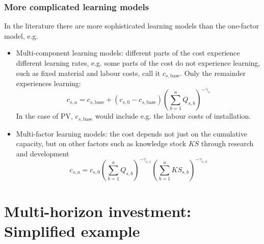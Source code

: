 \documentclass[10pt,aspectratio=169,dvipsnames]{beamer}
\let\olditem\item
\renewcommand{\item}{%
\olditem\vspace{5pt}}
\begin{document}
\begin{frame}
  \frametitle{More complicated learning models}

  In the literature there are more sophisticated learning models than the one-factor model, e.g.
  \begin{itemize}
  \item \alert{Multi-component learning models}: different parts of the
    cost experience different learning rates, e.g. some parts of the
    cost do not experience learning, such as fixed material and labour
    costs, call it $c_{s,\textrm{base}}$. Only the remainder
    experiences learning:
  \begin{equation*}
    c_{s,a} = c_{s,\textrm{base}} + (c_{s,0}-c_{s,\textrm{base}}) \left(\sum_{b=1}^a Q_{s,b} \right)^{-\gamma_s}
  \end{equation*}
  In the case of PV, $c_{s,\textrm{base}}$ would include e.g. the labour costs of installation.
  \item \alert{Multi-factor learning models}: the cost depends not just on the cumulative capacity, but on other factors such as knowledge stock $KS$ through research and development
  \begin{equation*}
    c_{s,a} = c_{s,0}\left(\sum_{b=1}^a Q_{s,b} \right)^{-\gamma_{s,1}} \left(\sum_{b=1}^a KS_{s,b} \right)^{-\gamma_{s,2}}
  \end{equation*}


  \end{itemize}

\end{frame}

\section{Multi-horizon investment: Simplified example}
\end{document}
